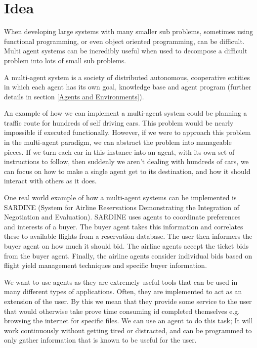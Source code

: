 \documentclass[]{final_report}
\begin{document}
\section{Idea}

When developing large systems with many smaller sub problems, sometimes using functional programming, or even object oriented programming, can be difficult. Multi agent systems can be incredibly useful when used to decompose a difficult problem into lots of small sub problems. 

A multi-agent system is a society of distributed autonomous, cooperative entities\cite{leitao2013multi} in which each agent has its own goal, knowledge base and agent program   (further details in section \ref{Agents and Environments}).

An example of how we can implement a multi-agent system could be planning a traffic route for hundreds of self driving cars. This problem would be nearly impossible if executed functionally. However, if we were to approach this problem in the multi-agent paradigm, we can abstract the problem into manageable pieces. If we turn each car in this instance into an agent, with its own set of instructions to follow, then suddenly we aren't dealing with hundreds of cars, we can focus on how to make a single agent get to its destination, and how it should interact with others as it does. 

One real world example of how a multi-agent systems can be implemented is SARDINE (System for Airline Reservations Demonstrating the Integration of Negotiation and Evaluation). SARDINE uses agents to coordinate preferences and interests of a buyer. The buyer agent takes this information and correlates these to available flights from a reservation database. The user then informers the buyer agent on how much it should bid. The airline agents accept the ticket bids from the buyer agent. Finally, the airline agents consider
individual bids based on flight yield management techniques and specific buyer information\cite{oprea2004applications}.

We want to use agents as they are extremely useful tools that can be used in many different types of applications. Often, they are implemented to act as an extension of the user. By this we mean that they provide some service to the user that would otherwise take prove time consuming id completed themselves e.g. browsing the internet for specific files. We can use an agent to do this task; It will work continuously without getting tired or distracted, and can be programmed to only gather information that is known to be useful for the user\cite{jennings1996software}.  
\end{document}
